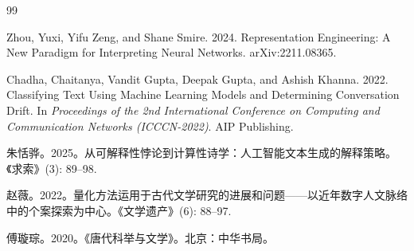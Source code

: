 \documentclass[12pt,a4paper]{article}
\numberwithin{equation}{section}
\begin{document}
{\begin{thebibliography}{99}
\item Zhou, Yuxi, Yifu Zeng, and Shane Smire. 2024. Representation Engineering: A New Paradigm for Interpreting Neural Networks. arXiv:2211.08365.

\item Chadha, Chaitanya, Vandit Gupta, Deepak Gupta, and Ashish Khanna. 2022. Classifying Text Using Machine Learning Models and Determining Conversation Drift. In \textit{Proceedings of the 2nd International Conference on Computing and Communication Networks (ICCCN-2022)}. AIP Publishing.

\item 朱恬骅。2025。从可解释性悖论到计算性诗学：人工智能文本生成的解释策略。《求索》(3): 89--98.

\item 赵薇。2022。量化方法运用于古代文学研究的进展和问题——以近年数字人文脉络中的个案探索为中心。《文学遗产》(6): 88--97.

\item 傅璇琮。2020。《唐代科举与文学》。北京：中华书局。

\end{thebibliography}
}
\end{document}
